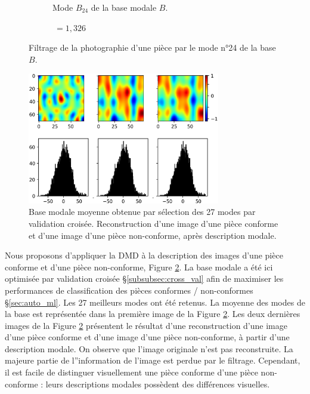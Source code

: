 \begin{figure}[htb]
\begin{subfigure}[c]{0.37\textwidth}
		\caption{Mode $B_{24}$ de la base modale $B$.}
	\end{subfigure}
	\begin{subfigure}[r]{0.20\textwidth}
		$\ = 1,326$
	\end{subfigure}
	\caption{Filtrage de la photographie d'une pièce par le mode n°24 de la base $B$.}
	\label{fig:dmd_filtering}
\end{figure}

\bigskip

\begin{figure}[bht]
	\centering
	\includegraphics[width=0.75\textwidth]{../Chap2/Figures/DMD_reconstruction_27modes.png}
	\caption{Base modale moyenne obtenue par sélection des 27 modes par validation croisée. Reconstruction d'une image d'une pièce conforme et d'une image d'une pièce non-conforme, après description modale.}
	\label{fig:dmd_reconstruction}
\end{figure}

Nous proposons d'appliquer la DMD à la description des images d'une pièce conforme et d'une pièce non-conforme, Figure \ref{fig:dmd_reconstruction}.
La base modale a été ici optimisée par validation croisée §\ref{subsubsec:cross_val} afin de maximiser les performances de classification des pièces conformes / non-conformes §\ref{sec:auto_ml}.
Les 27 meilleurs modes ont été retenus.
La moyenne des modes de la base est représentée dans la première image de la Figure \ref{fig:dmd_reconstruction}.
Les deux dernières images de la Figure \ref{fig:dmd_reconstruction} présentent le résultat d'une reconstruction d'une image d'une pièce conforme et d'une image d'une pièce non-conforme, à partir d'une description modale.
On observe que l'image originale n'est pas reconstruite.
La majeure partie de l''information de l'image est perdue par le filtrage.
Cependant, il est facile de distinguer visuellement une pièce conforme d'une pièce non-conforme : leurs descriptions modales possèdent des différences visuelles.

